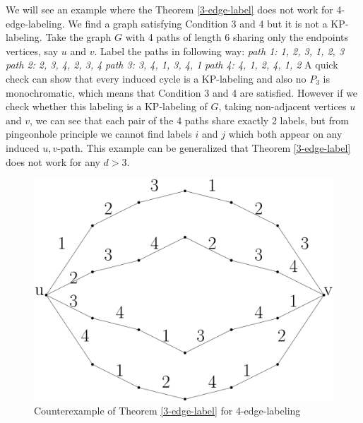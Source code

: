 \documentclass[12pt,a4paper,titlepage,openany]{report}
\begin{document}
\begin{example}
We will see an example where the Theorem \ref{3-edge-label} does not work for 4-edge-labeling. We find a graph satisfying Condition 3 and 4 but it is not a KP-labeling.\newline
Take the graph $G$ with 4 paths of length 6 sharing only the endpoints vertices, say $u$ and $v$. Label the paths in following way:\newline
\textit{path 1: 1, 2, 3, 1, 2, 3}\newline
\textit{path 2: 2, 3, 4, 2, 3, 4}\newline
\textit{path 3: 3, 4, 1, 3, 4, 1}\newline
\textit{path 4: 4, 1, 2, 4, 1, 2}\newline
A quick check can show that every induced cycle is a KP-labeling and also no $P_3$ is monochromatic, which means that Condition 3 and 4 are satisfied. However if we check whether this labeling is a KP-labeling of $G$, taking non-adjacent vertices $u$ and $v$, we can see that each pair of the 4 paths share exactly 2 labels, but from pingeonhole principle we cannot find labels $i$ and $j$ which both appear on any induced $u, v$-path.\newline
This example can be generalized that Theorem \ref{3-edge-label} does not work for any $d>3$.  
\begin{figure}[h]
\begin{center}
\includegraphics[width=1\linewidth]{figures/d4.png}
\end{center}
\caption{Counterexample of Theorem \ref{3-edge-label} for 4-edge-labeling}
\end{figure}
\end{example}
\end{document}
